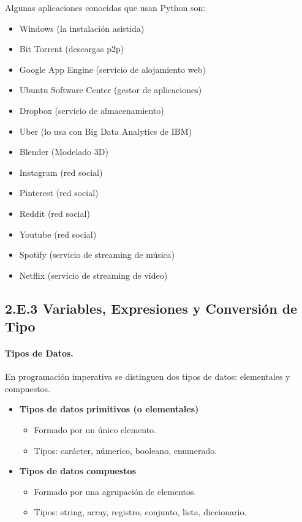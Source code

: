 Algunas aplicaciones conocidas que usan Python son:


\begin{itemize}
\item Windows (la instalación asistida)
\item Bit Torrent (descargas p2p)
\item Google App Engine (servicio de alojamiento web)
\item Ubuntu Software Center (gestor de aplicaciones)
\item Dropbox (servicio de almacenamiento)
\item Uber (lo usa con Big Data Analytics de IBM)
\item Blender (Modelado 3D)
\item Instagram (red social)
\item Pinterest (red social)
\item Reddit (red social)
\item Youtube (red social)
\item Spotify (servicio de streaming de música)
\item Netflix (servicio de streaming de video)
\end{itemize}




\subsection*{2.E.3 Variables, Expresiones y Conversión de Tipo}



\paragraph{Tipos de Datos.}
En programación imperativa se distinguen dos tipos de datos: elementales y compuestos.

\begin{itemize}

\item \textbf{Tipos de datos primitivos (o elementales)}

\begin{itemize}
\item Formado por un único elemento.
\item Tipos: carácter,  númerico,  booleano,  enumerado.
\end{itemize}


\item \textbf{Tipos de datos compuestos}

\begin{itemize}
\item   Formado por una agrupación de elementos.
\item Tipos: string, array,  registro,  conjunto,  lista, diccionario.
\end{itemize}

\end{itemize}


